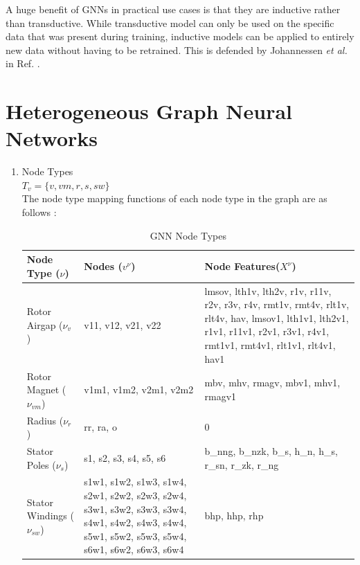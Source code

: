 \documentclass{report} %
\begin{document}
A huge benefit of \ac{GNN}s in practical use cases is that they are inductive rather 
than transductive. While transductive model can only be used on the specific data that was present during training, inductive models can be applied to entirely new 
data without having to be retrained. This is defended by Johannessen \textit{et al.} in Ref. \cite{ML HGNN-2023}.

\section{Heterogeneous Graph Neural Networks}
\begin{enumerate}
    \item Node Types \\
    \( T_v = \{ v, vm, r, s, sw\} \) \\
    The node type mapping functions of each node type in the graph are as follows :

    \begin{table}[H]
        \centering
        \begin{tabular}{|p{}|p{}|p{}|}
        \hline 
        {\bf Node Type (\(\nu\))} & {\bf Nodes (\( v^{\nu} \))} & {\bf Node Features(\( X^{\nu}\))}  \\
        \hline
        Rotor Airgap (\( \nu_v \)) & v11, v12, v21, v22 &
        lmsov, lth1v, lth2v, r1v, r11v, r2v, r3v, r4v, rmt1v, rmt4v, rlt1v, rlt4v, hav, \newline
        lmsov1, lth1v1, lth2v1, r1v1, r11v1, r2v1, r3v1, r4v1, rmt1v1, rmt4v1, rlt1v1, rlt4v1, hav1 \\
        \hline
        Rotor Magnet (\( \nu_{vm} \)) & 
        v1m1, v1m2, v2m1, v2m2 & 
        mbv, mhv, rmagv, mbv1, mhv1, rmagv1 \\
        \hline
        Radius (\( \nu_r \)) & 
        rr, ra, o & 0 \\
        \hline
        Stator Poles (\( \nu_s \)) & 
        s1, s2, s3, s4, s5, s6 & 
        b\_nng, b\_nzk, b\_s, h\_n, h\_s, r\_sn, r\_zk, r\_ng \\
        \hline
        Stator Windings (\( \nu_{sw} \)) & 
        s1w1, s1w2, s1w3, s1w4, \newline
        s2w1, s2w2, s2w3, s2w4, \newline
        s3w1, s3w2, s3w3, s3w4, \newline
        s4w1, s4w2, s4w3, s4w4, \newline
        s5w1, s5w2, s5w3, s5w4, \newline
        s6w1, s6w2, s6w3, s6w4 & 
        bhp, hhp, rhp \\
        \hline
        \end{tabular}
        \caption{\ac{GNN} Node Types}
        \label{tab:GNN Node Types}
    \end{table}


\end{enumerate}
\end{document}
